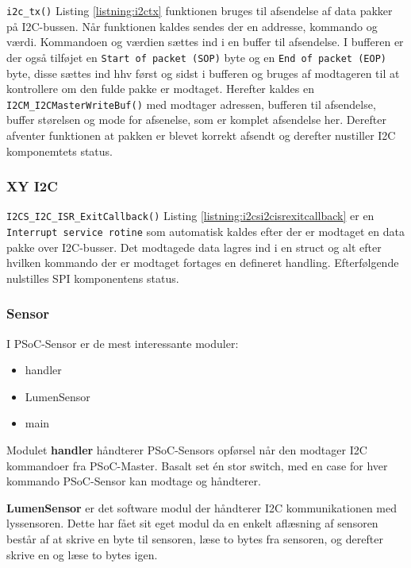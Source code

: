 \verb+i2c_tx()+ Listing \ref{listning:i2ctx} funktionen bruges til afsendelse af data pakker på I2C-bussen. Når funktionen kaldes sendes der en addresse, kommando og værdi. Kommandoen og værdien sættes ind i en buffer til afsendelse. I bufferen er der også tilføjet en \verb+Start of packet (SOP)+ byte og en \verb+End of packet (EOP)+ byte, disse sættes ind hhv først og sidst i bufferen og bruges af modtageren til at kontrollere om den fulde pakke er modtaget.
Herefter kaldes en \verb+I2CM_I2CMasterWriteBuf()+ med modtager adressen, bufferen til afsendelse, buffer størelsen og mode for afsenelse, som er komplet afsendelse her. Derefter afventer funktionen at pakken er blevet korrekt afsendt og derefter nustiller I2C komponemtets status.


\subsubsection{XY I2C}



\verb+I2CS_I2C_ISR_ExitCallback()+ Listing \ref{listning:i2csi2cisrexitcallback} er en \verb+Interrupt service rotine+ som automatisk kaldes efter der er modtaget en data pakke over I2C-busser.
Det modtagede data lagres ind i en struct og alt efter hvilken kommando der er modtaget fortages en defineret handling. Efterfølgende nulstilles SPI komponentens status.

\subsubsection{Sensor}

I PSoC-Sensor er de mest interessante moduler:

\begin{itemize}
	\item handler
	\item LumenSensor
	\item main
\end{itemize}

Modulet \textbf{handler} håndterer PSoC-Sensors opførsel når den modtager I2C kommandoer fra PSoC-Master. Basalt set én stor switch, med en case for hver kommando PSoC-Sensor kan modtage og håndterer.

\textbf{LumenSensor} er det software modul der håndterer I2C kommunikationen med lyssensoren. Dette har fået sit eget modul da en enkelt aflæsning af sensoren består af at skrive en byte til sensoren, læse to bytes fra sensoren, og derefter skrive en og læse to bytes igen.

